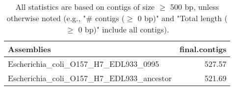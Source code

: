 \documentclass[12pt,a4paper]{article}
\begin{document}
\begin{table}[ht]
\begin{center}
\caption{All statistics are based on contigs of size $\geq$ 500 bp, unless otherwise noted (e.g., "\# contigs ($\geq$ 0 bp)" and "Total length ($\geq$ 0 bp)" include all contigs).}
\begin{tabular}{|l*{1}{|r}|}
\hline
Assemblies & final.contigs \\ \hline
Escherichia\_coli\_O157\_H7\_EDL933\_0995 & 527.57 \\ \hline
Escherichia\_coli\_O157\_H7\_EDL933\_ancestor & 521.69 \\ \hline
\end{tabular}
\end{center}
\end{table}
\end{document}
